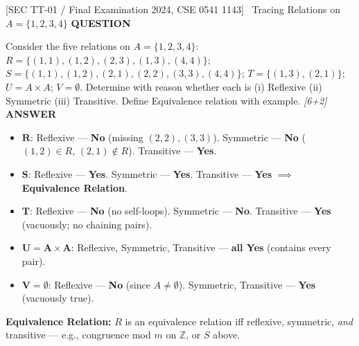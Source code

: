 \documentclass[11pt,a4paper]{article}
\newcommand{\Qlabel}{\textbf{\color{navy}\footnotesize\MakeUppercase{Question}}\par\smallskip}
\newcommand{\Alabel}{\textbf{\color{teal}\footnotesize\MakeUppercase{Answer}}\par\smallskip}
\begin{document}
\begin{exambox}{[SEC TT-01 / Final Examination 2024, CSE 0541 1143] \ Tracing Relations on $A = \{1, 2, 3, 4\}$}
\Qlabel
Consider the five relations on $A=\{1,2,3,4\}$: $R=\{(1,1),(1,2),(2,3),(1,3),(4,4)\}$; $S=\{(1,1),(1,2),(2,1),(2,2),(3,3),(4,4)\}$; $T=\{(1,3),(2,1)\}$; $U=A\times A$; $V=\emptyset$. Determine with reason whether each is (i) Reflexive (ii) Symmetric (iii) Transitive. Define Equivalence relation with example. \hfill\textit{[6+2]}
\tcblower
\Alabel
\begin{itemize}
    \item $\mathbf{R}$: Reflexive --- \textbf{No} (missing $(2,2),(3,3)$). Symmetric --- \textbf{No} ($(1,2)\in R$, $(2,1)\notin R$). Transitive --- \textbf{Yes}.
    \item $\mathbf{S}$: Reflexive --- \textbf{Yes}. Symmetric --- \textbf{Yes}. Transitive --- \textbf{Yes} $\implies$ \textbf{Equivalence Relation}.
    \item $\mathbf{T}$: Reflexive --- \textbf{No} (no self-loops). Symmetric --- \textbf{No}. Transitive --- \textbf{Yes} (vacuously; no chaining pairs).
    \item $\mathbf{U=A\times A}$: Reflexive, Symmetric, Transitive --- \textbf{all Yes} (contains every pair).
    \item $\mathbf{V=\emptyset}$: Reflexive --- \textbf{No} (since $A\neq\emptyset$). Symmetric, Transitive --- \textbf{Yes} (vacuously true).
\end{itemize}
\textbf{Equivalence Relation:} $R$ is an equivalence relation iff reflexive, symmetric, \emph{and} transitive --- e.g., congruence mod $m$ on $\mathbb{Z}$, or $S$ above.
\end{exambox}
\end{document}
